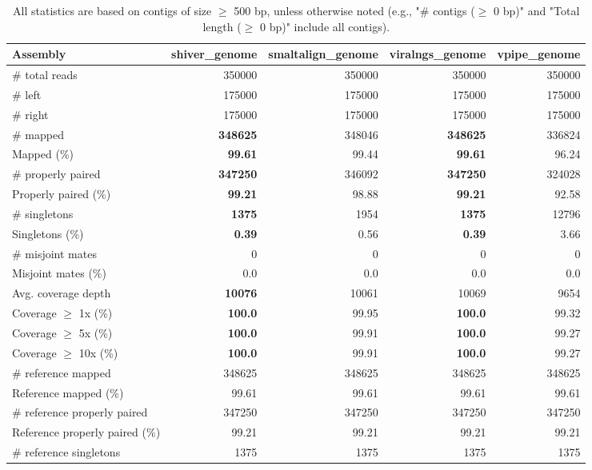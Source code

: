 \documentclass[12pt,a4paper]{article}
\begin{document}
\begin{table}[ht]
\begin{center}
\caption{All statistics are based on contigs of size $\geq$ 500 bp, unless otherwise noted (e.g., "\# contigs ($\geq$ 0 bp)" and "Total length ($\geq$ 0 bp)" include all contigs).}
\begin{tabular}{|l*{4}{|r}|}
\hline
Assembly & shiver\_genome & smaltalign\_genome & viralngs\_genome & vpipe\_genome \\ \hline
\# total reads & 350000 & 350000 & 350000 & 350000 \\ \hline
\# left & 175000 & 175000 & 175000 & 175000 \\ \hline
\# right & 175000 & 175000 & 175000 & 175000 \\ \hline
\# mapped & {\bf 348625} & 348046 & {\bf 348625} & 336824 \\ \hline
Mapped (\%) & {\bf 99.61} & 99.44 & {\bf 99.61} & 96.24 \\ \hline
\# properly paired & {\bf 347250} & 346092 & {\bf 347250} & 324028 \\ \hline
Properly paired (\%) & {\bf 99.21} & 98.88 & {\bf 99.21} & 92.58 \\ \hline
\# singletons & {\bf 1375} & 1954 & {\bf 1375} & 12796 \\ \hline
Singletons (\%) & {\bf 0.39} & 0.56 & {\bf 0.39} & 3.66 \\ \hline
\# misjoint mates & 0 & 0 & 0 & 0 \\ \hline
Misjoint mates (\%) & 0.0 & 0.0 & 0.0 & 0.0 \\ \hline
Avg. coverage depth & {\bf 10076} & 10061 & 10069 & 9654 \\ \hline
Coverage $\geq$ 1x (\%) & {\bf 100.0} & 99.95 & {\bf 100.0} & 99.32 \\ \hline
Coverage $\geq$ 5x (\%) & {\bf 100.0} & 99.91 & {\bf 100.0} & 99.27 \\ \hline
Coverage $\geq$ 10x (\%) & {\bf 100.0} & 99.91 & {\bf 100.0} & 99.27 \\ \hline
\# reference mapped & 348625 & 348625 & 348625 & 348625 \\ \hline
Reference mapped (\%) & 99.61 & 99.61 & 99.61 & 99.61 \\ \hline
\# reference properly paired & 347250 & 347250 & 347250 & 347250 \\ \hline
Reference properly paired (\%) & 99.21 & 99.21 & 99.21 & 99.21 \\ \hline
\# reference singletons & 1375 & 1375 & 1375 & 1375 \\ \hline

\end{tabular}
\end{center}
\end{table}
\end{document}
